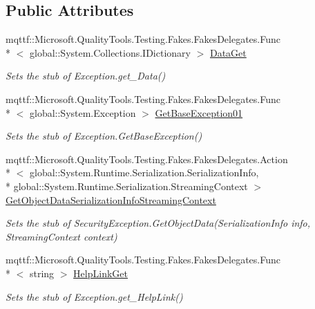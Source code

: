 \subsection*{Public Attributes}
\begin{DoxyCompactItemize}
\item 
mqttf\-::\-Microsoft.\-Quality\-Tools.\-Testing.\-Fakes.\-Fakes\-Delegates.\-Func\\*
$<$ global\-::\-System.\-Collections.\-I\-Dictionary $>$ \hyperlink{class_system_1_1_security_1_1_fakes_1_1_stub_security_exception_a4ef8a337c1504dc80c7f9fafaaa7a8b9}{Data\-Get}
\begin{DoxyCompactList}\small\item\em Sets the stub of Exception.\-get\-\_\-\-Data()\end{DoxyCompactList}\item 
mqttf\-::\-Microsoft.\-Quality\-Tools.\-Testing.\-Fakes.\-Fakes\-Delegates.\-Func\\*
$<$ global\-::\-System.\-Exception $>$ \hyperlink{class_system_1_1_security_1_1_fakes_1_1_stub_security_exception_ab09a5187af01f82c2be7a48e876861c3}{Get\-Base\-Exception01}
\begin{DoxyCompactList}\small\item\em Sets the stub of Exception.\-Get\-Base\-Exception()\end{DoxyCompactList}\item 
mqttf\-::\-Microsoft.\-Quality\-Tools.\-Testing.\-Fakes.\-Fakes\-Delegates.\-Action\\*
$<$ global\-::\-System.\-Runtime.\-Serialization.\-Serialization\-Info, \\*
global\-::\-System.\-Runtime.\-Serialization.\-Streaming\-Context $>$ \hyperlink{class_system_1_1_security_1_1_fakes_1_1_stub_security_exception_a002712d5c9aa088e7d3d9892d3386821}{Get\-Object\-Data\-Serialization\-Info\-Streaming\-Context}
\begin{DoxyCompactList}\small\item\em Sets the stub of Security\-Exception.\-Get\-Object\-Data(\-Serialization\-Info info, Streaming\-Context context)\end{DoxyCompactList}\item 
mqttf\-::\-Microsoft.\-Quality\-Tools.\-Testing.\-Fakes.\-Fakes\-Delegates.\-Func\\*
$<$ string $>$ \hyperlink{class_system_1_1_security_1_1_fakes_1_1_stub_security_exception_a6e783c9b7d645215f7e3f061de2c5bc9}{Help\-Link\-Get}
\begin{DoxyCompactList}\small\item\em Sets the stub of Exception.\-get\-\_\-\-Help\-Link()\end{DoxyCompactList}\item 

\end{DoxyCompactItemize}
